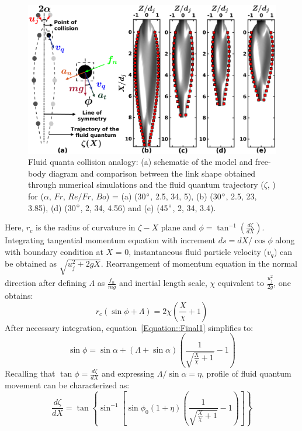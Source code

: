 \begin{figure}
	\centering
	\includegraphics[width=\linewidth]{chapters/Figure10}
	\caption{Fluid quanta collision analogy: (a) schematic of the model and free-body diagram and comparison between the link shape obtained through numerical simulations and the fluid quantum trajectory ($\zeta$, \protect\MarkerSquareRed) for ($\alpha$, $Fr$, $Re/Fr$, $Bo$) = (a) (30$\degree$, 2.5, 34, 5), (b) (30$\degree$, 2.5, 23, 3.85), (d) (30$\degree$, 2, 34, 4.56) and (e) (45$\degree$, 2, 34, 3.4).}
	\label{Figure::analytical}
\end{figure}%
Here, $r_c$ is the radius of curvature in $\zeta-X$ plane and $\phi = \tan^{-1}\left(\frac{d\zeta}{dX}\right)$. Integrating tangential momentum equation with increment $ds = dX/\cos\phi$ along with boundary condition at $X$ = 0, instantaneous fluid particle velocity ($v_{q}$) can be obtained as $\sqrt{u_j^2 + 2gX}$. Rearrangement of momentum equation in the normal direction after defining $\Lambda$ as $\frac{f_n}{mg}$ and inertial length scale, $\chi$ equivalent to $\frac{u_j^2}{2g}$, one obtains:
\begin{equation}\label{Equation::Final1}
r_c\left(\sin\phi + \Lambda\right) = 2\chi\left(\frac{X}{\chi} + 1\right)
\end{equation} 
After necessary integration, equation~\ref{Equation::Final1} simplifies to:
\begin{equation}
\sin\phi  = \sin\alpha + \left(\Lambda + \sin\alpha\right)\left(\frac{1}{\sqrt{\frac{X}{\chi} + 1}} - 1\right)	
\end{equation}
Recalling that $\tan\phi = \frac{d\zeta}{dX}$ and expressing $\Lambda/\sin\alpha = \eta$, profile of fluid quantum movement can be characterized as:
\begin{equation}
\label{Equation::AnaFinal}
\frac{d\zeta}{dX} = \tan\left\lbrace\sin^{-1}\left[ \sin\phi_0\left(1 + \eta\right)\left(\frac{1}{\sqrt{\frac{X}{\chi} + 1}} - 1\right) \right]\right\rbrace
\end{equation}
